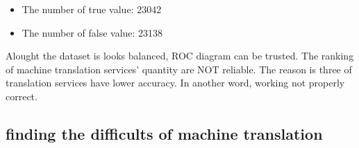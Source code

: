 \documentclass[conference]{IEEEtran}
\begin{document}
\begin{enumerate}
\begin{itemize}
\item The number of true value: 23042
\item The number of false value: 23138
\end{itemize}

Alought the dataset is looks balanced, ROC diagram can be trusted. The ranking
of machine translation services' quantity are NOT reliable. The reason is three of translation services
have lower accuracy. In another word, working not properly correct.

\subsection{finding the difficults of machine translation}


\end{enumerate}



\end{document}
